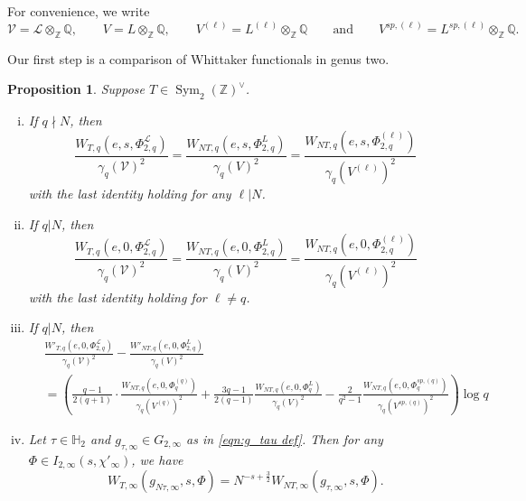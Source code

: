 \documentclass[reqno,oneside]{amsart}
\theoremstyle{plain}
\newtheorem{proposition}[theorem]{Proposition}
\theoremstyle{remark}
\numberwithin{theorem}{section}
\newcommand{\bbQ}{\mathbb Q}
\newcommand{\bbZ}{\mathbb Z}
\newcommand{\calL}{\mathcal L}
\newcommand{\calV}{\mathcal V}
\DeclareMathOperator{\Sym}{Sym}
\begin{document}
	For convenience, we write
	\begin{equation}
	\calV = \calL \otimes_{\bbZ} \bbQ, \qquad V = L \otimes_{\bbZ} \bbQ, \qquad V^{(\ell)} = L^{(\ell)} \otimes_{\bbZ} \bbQ \qquad \text{and} \qquad V^{sp, (\ell)} = L^{sp, (\ell)} \otimes_{\bbZ} \bbQ.
	\end{equation}
	
	
	
	Our first step is a comparison of Whittaker functionals in genus two.
	
	
	
	\begin{proposition} \label{prop:alt lattice rk 2} Suppose $T \in \Sym_2(\bbZ)^{\vee}$.
		
		\begin{enumerate}[(i)]
			\item If $q \nmid N$, then
			\[
			\frac{W_{T,q}(e, s, \Phi^{\calL}_{2,q})}{\gamma_q(\calV)^{2}} = \frac{W_{NT,q}(e, s, \Phi^{L}_{2,q})}{\gamma_q(V)^{2}} =  \frac{W_{NT,q}(e, s, \Phi^{(\ell)}_{2,q})}{\gamma_q(V^{(\ell)})^{2}}
			\]
			with the last identity holding for any $\ell | N$.
			\item If $q | N$, then
			\[
			\frac{W_{T,q}(e, 0, \Phi^{\calL}_{2,q})}{\gamma_q(\calV)^{2}} = \frac{W_{NT,q}(e, 0, \Phi^{L}_{2,q})}{\gamma_q(V)^{2}} =  \frac{W_{NT,q}(e, 0, \Phi^{(\ell)}_{2,q})}{\gamma_q(V^{(\ell)})^{2}}
			\]
			with the last identity holding for $\ell \neq q$.
			\item If $q|N$, then
			\begin{align*}
			&\frac{ W'_{T,q}(e , 0, \Phi^{\calL}_{2,q})}{\gamma_q(\calV)^2} - \frac{ W'_{NT,q}(e , 0, \Phi^{L}_{2,q})}{\gamma_q(V)^2} \\
			&= \left( \frac{q-1}{2(q+1)} \cdot \frac{W_{NT, q}(e, 0, \Phi_q^{(q)})}{\gamma_q(V^{(q)})^2} + \frac{3 q - 1}{2(q-1)} \frac{W_{NT,q}(e, 0, \Phi_q^L)}{ \gamma_q(V)^2} - \frac{2}{q^2-1} \frac{W_{NT,q}(e, 0, \Phi_q^{sp, (q)})}{\gamma_q(V^{sp,(q)})^2} \right) \log q
			\end{align*}
			\item Let $\tau \in \mathbb H_2$ and $g_{\tau,\infty} \in G_{2, \infty}$ as in \eqref{eqn:g_tau def}. Then for any $\Phi \in I_{2, \infty}(s, \chi'_{\infty})$, we have
			\[
			W_{T, \infty}(g_{N\tau, \infty}, s, \Phi) = N^{-s + \frac32} W_{NT, \infty}(g_{\tau,\infty}, s, \Phi).
			\]
			

\end{enumerate}
\end{proposition}
\end{document}
